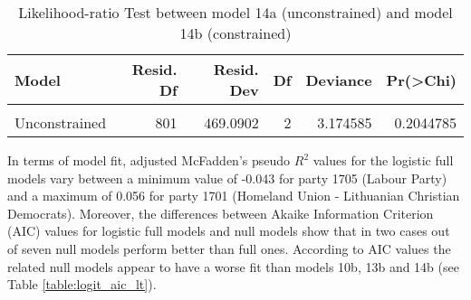 \documentclass[
]{article}
\begin{document}
\begin{table}[!h]

\caption{\label{tab:unnamed-chunk-112}Likelihood-ratio Test between model 14a (unconstrained) and model 14b (constrained)
                  \label{table:lrtest_3_lt}}
\centering
\begin{tabular}[t]{l|r|r|r|r|r}
\hline
Model & Resid. Df & Resid. Dev & Df & Deviance & Pr(>Chi)\\
\hline
\cellcolor{gray!6}{Constrained} & \cellcolor{gray!6}{803} & \cellcolor{gray!6}{472.2648} & \cellcolor{gray!6}{} & \cellcolor{gray!6}{} & \cellcolor{gray!6}{}\\
\hline
Unconstrained & 801 & 469.0902 & 2 & 3.174585 & 0.2044785\\
\hline
\end{tabular}
\end{table}

In terms of model fit, adjusted McFadden's pseudo \(R^2\) values for the logistic full models vary between
a minimum value of
-0.043
for party 1705
(Labour Party)
and a maximum of
0.056
for party 1701
(Homeland Union - Lithuanian Christian Democrats).
Moreover, the differences between Akaike Information Criterion (AIC) values for logistic full models and
null models show that in two cases out of seven null models perform better than full ones. According to AIC
values the related null models appear to have a worse fit than models 10b, 13b and 14b (see Table \ref{table:logit_aic_lt}).
\end{document}
